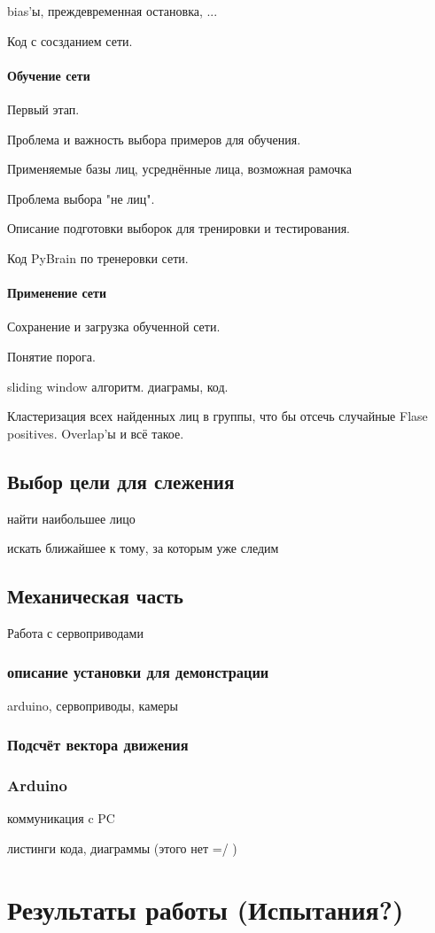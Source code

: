 \documentclass[12pt]{report}
\begin{document}
bias'ы, преждевременная остановка, ...

Код с сосзданием сети.
\subsubsection{Обучение сети}
Первый этап.

Проблема и важность выбора примеров для обучения.

Применяемые базы лиц, усреднённые лица, возможная рамочка

Проблема выбора "не лиц".

Описание подготовки выборок для тренировки и тестирования.

Код PyBrain по тренеровки сети.
\subsubsection{Применение сети}
Сохранение и загрузка обученной сети.

Понятие порога.

sliding window алгоритм. диаграмы, код.

Кластеризация всех найденных лиц в группы, что бы отсечь случайные Flase positives. Overlap'ы и всё такое.
\section{Выбор цели для слежения}
найти наибольшее лицо

искать ближайшее к тому, за которым уже следим
\section{Механическая часть}
Работа с сервоприводами
\subsection{описание установки для демонстрации}
arduino,
сервоприводы,
камеры
\subsection{Подсчёт вектора движения}
\subsection{Arduino}
коммуникация c PC

листинги кода, диаграммы (этого нет =/ )


\chapter{Результаты работы (Испытания?)}
\thispagestyle{fancy}
\end{document}
